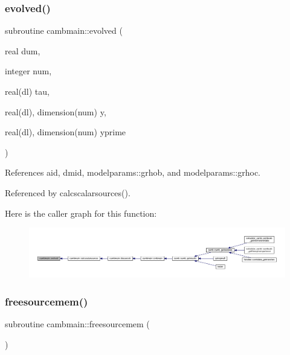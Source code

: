 \subsubsection{\texorpdfstring{evolved()}{evolved()}}
{\footnotesize\ttfamily subroutine cambmain\+::evolved (\begin{DoxyParamCaption}\item[{real}]{dum,  }\item[{integer}]{num,  }\item[{real(dl)}]{tau,  }\item[{real(dl), dimension(num)}]{y,  }\item[{real(dl), dimension(num)}]{yprime }\end{DoxyParamCaption})\hspace{0.3cm}{\ttfamily [private]}}



References aid, dmid, modelparams\+::grhob, and modelparams\+::grhoc.



Referenced by calcscalarsources().

Here is the caller graph for this function\+:
\nopagebreak
\begin{figure}[H]
\begin{center}
\leavevmode
\includegraphics[width=350pt]{namespacecambmain_a8861dfd3252de9c7b39b9c09ee415010_icgraph}
\end{center}
\end{figure}
\mbox{\label{namespacecambmain_a47cd48fe0174b214ddc23bcdd91b6754}} 
\subsubsection{\texorpdfstring{freesourcemem()}{freesourcemem()}}
{\footnotesize\ttfamily subroutine cambmain\+::freesourcemem (\begin{DoxyParamCaption}{ }\end{DoxyParamCaption})\hspace{0.3cm}{\ttfamily [private]}}



